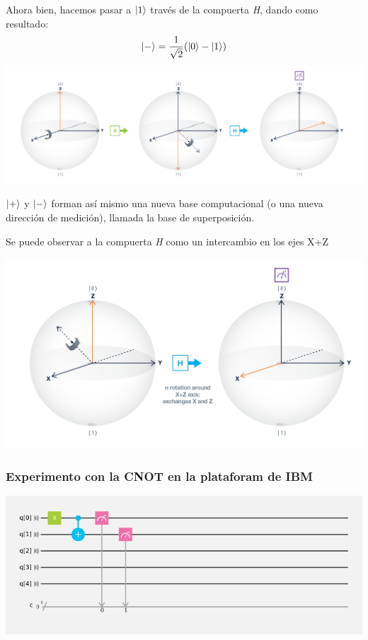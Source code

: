 \documentclass{beamer}
\begin{document}
\begin{frame}
  Ahora bien, hacemos pasar a $\ket{1}$ través de la compuerta \textit{H}, dando como
  resultado:
  $$ \ket{-} = \frac{1}{\sqrt{2}}( \ket{0} - \ket{1} ) $$
  \includegraphics[scale=.2]{-superpositionstate.png}
\end{frame}
\begin{frame}
  $\ket{+}$ y $\ket{-}$ forman así mismo una nueva base computacional (o una nueva dirección de
  medición), llamada la base de superposición.
\end{frame}

\begin{frame}
  Se puede observar a la compuerta \textit{H} como un intercambio en los ejes X+Z

  \includegraphics[scale=.3]{HADAMARD-GATE-BLOSCH.png}
\end{frame}

\begin{frame}
  \frametitle{Experimento con la CNOT en la plataforam de IBM}
  \includegraphics[scale=.35]{CNOT-IBM-CIRCUIT.png}
\end{frame}
\end{document}

